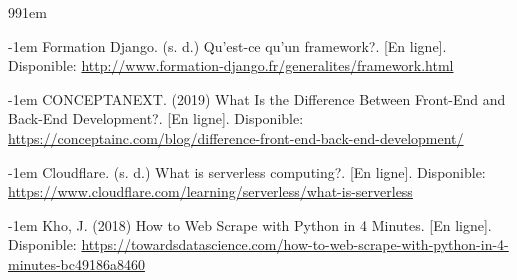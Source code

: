 \documentclass[12pt]{article}
\begin{document}
\newpage 

\def\bibindent{1em}
\begin{thebibliography}{99\kern\bibindent}
\makeatletter
\let\old@biblabel\@biblabel
\def\@biblabel#1{\old@biblabel{#1}\kern\bibindent}
\let\old@bibitem\bibitem
\def\bibitem#1{\old@bibitem{#1}\leavevmode\kern-\bibindent}
\makeatother

    
    Formation Django. (s. d.) Qu'est-ce qu'un framework?. [En ligne].
    Disponible: \url{http://www.formation-django.fr/generalites/framework.html}

    CONCEPTANEXT. (2019) What Is the Difference Between Front-End and Back-End Development?. [En ligne].
    Disponible: \url{https://conceptainc.com/blog/difference-front-end-back-end-development/}
    
    Cloudflare. (s. d.) What is serverless computing?. [En ligne]. Disponible:
    \url{https://www.cloudflare.com/learning/serverless/what-is-serverless}

    Kho, J. (2018) How to Web Scrape with Python in 4 Minutes. [En ligne]. Disponible:
    \url{https://towardsdatascience.com/how-to-web-scrape-with-python-in-4-minutes-bc49186a8460}

    

\end{thebibliography}
\end{document}
